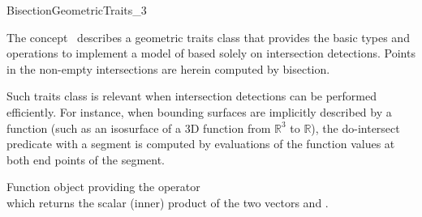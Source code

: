 \ccRefPageBegin


\begin{ccRefConcept}{BisectionGeometricTraits_3}


\ccDefinition
  
The concept \ccRefName\ describes a geometric traits class
that provides the basic types and operations 
to implement a model of 
based solely on  intersection detections. 
Points in the  non-empty intersections  are herein computed
by  bisection. 

Such traits class  is relevant when intersection detections
can be performed efficiently. For instance, when bounding surfaces
are implicitly described by a function (such as an isosurface of a 3D
function from $\mathbb{R}^3$ to $\mathbb{R}$), the do-intersect predicate with a segment
is computed by evaluations of the function values at both end points
of the segment.
 
\ccTypes

\ccGlue
{}
\ccGlue
{}
\ccGlue
{}
\ccGlue
{}
\ccGlue
{}
\ccGlue
{}


{Function object providing the operator\\
 which returns the scalar
(inner) product of the two vectors  and .}


\end{ccRefConcept}
